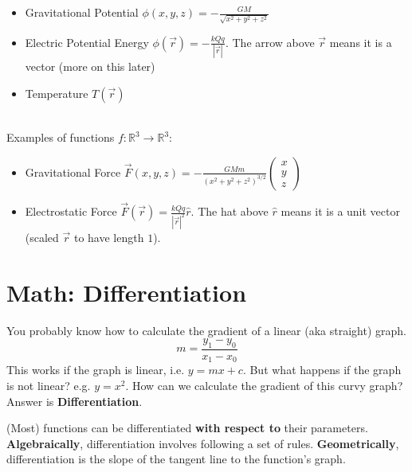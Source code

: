 \documentclass{article}
\begin{document}
\begin{itemize}
    \item Gravitational Potential $\phi(x,y,z) = -\frac{GM}{\sqrt{x^2+y^2+z^2}}$
    \item Electric Potential Energy $\phi(\vec{r}) = -\frac{kQq}{|\vec{r}|}$. The arrow above $\vec{r}$ means it is a vector (more on this later)
    \item Temperature $T(\vec{r})$
\end{itemize}
\leavevmode \\
Examples of functions $f: \mathbb R^3 \to \mathbb R^3$:

\begin{itemize}
    \item Gravitational Force $\vec{F}(x,y,z) = -\frac{GMm}{(x^2 + y^2 + z^2)^{3/2}} \left(\begin{array}{l}
x \\
y \\ 
z
\end{array}\right)$
    \item Electrostatic Force $\vec{F}(\vec{r}) = \frac{kQq}{|\vec{r}|^2} \hat{r}$. The hat above $\hat{r}$ means it is a unit vector (scaled $\vec{r}$ to have length $1$).
\end{itemize}

\section{Math: Differentiation}
You probably know how to calculate the gradient of a linear (aka straight) graph.
$$m = \frac{y_1 - y_0}{x_1 - x_0}$$
This works if the graph is linear, i.e. $y=mx+c$. But what happens if the graph is not linear? e.g. $y = x^2$. How can we calculate the gradient of this curvy graph? Answer is \textbf{Differentiation}.

(Most) functions can be differentiated \textbf{with respect to} their parameters. \textbf{Algebraically}, differentiation involves following a set of rules. \textbf{Geometrically}, differentiation is the slope of the tangent line to the function's graph. 
\end{document}
